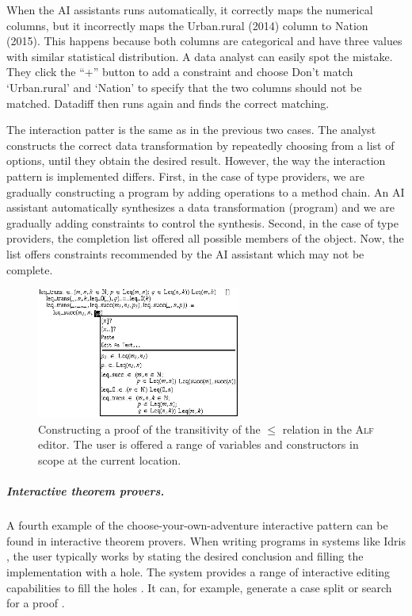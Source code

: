 \documentclass[anonymous, a4paper,UKenglish,cleveref, autoref, thm-restate]{lipics-v2021}
\newcommand{\ident}[1]{\textsf{#1}}
\begin{document}
When the AI assistants runs automatically, it correctly maps the numerical columns, but it
incorrectly maps the \ident{Urban.rural} (2014) column to \ident{Nation} (2015). This happens
because both columns are categorical and have three values with similar statistical distribution. A data
analyst can easily spot the mistake. They click the ``+'' button to add a constraint and choose
\ident{Don't match `Urban.rural' and `Nation'} to specify that the two columns should not be matched.
Datadiff then runs again and finds the correct matching.

The interaction patter is the same as in the previous two cases. The analyst constructs the
correct data transformation by repeatedly choosing from a list of options, until they obtain
the desired result. However, the way the interaction pattern is implemented differs.
First, in the case of type providers, we are gradually constructing a program by adding operations to
a method chain. An AI assistant automatically synthesizes a data transformation (program) and we are
gradually adding constraints to control the synthesis. Second, in the case of type providers,
the completion list offered all possible members of the object. Now, the list offers
constraints recommended by the AI assistant which may not be complete.

\begin{figure}[t]
  \vspace{-0.5em}
  \includegraphics[width=0.6\textwidth]{fig/alf.png}
  \caption{Constructing a proof of the transitivity of the $\leq$ relation in the \textsc{Alf}
    editor. The user is offered a range of variables and constructors in scope at the current
    location. \cite{altenkirch-1994-alf}}
  \label{fig:alf}
\end{figure}


\subparagraph{Interactive theorem provers.}
A fourth example of the choose-your-own-adventure interactive pattern can be found in interactive
theorem provers. When writing programs in systems like Idris \cite{brady-2021-idris2}, the
user typically works by stating the desired conclusion and filling the implementation with a hole.
The system provides a range of interactive editing capabilities to fill the holes \cite{mcbride-1999-dependently}.
It can, for example, generate a case split or search for a proof \cite{brady-2015-idris}.
\end{document}
